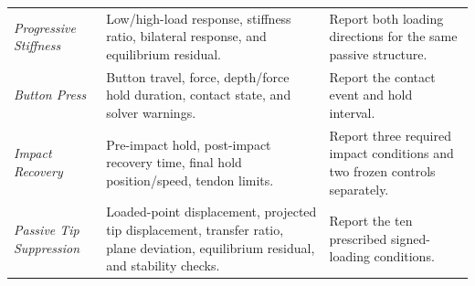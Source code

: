 \begin{table}[!t]
\begin{tabularx}{\textwidth}{@{}>{\itshape}p{}!{\color{TraceGray}\vrule width 0.25pt} >{\raggedright\arraybackslash}p{0.47\textwidth} Y@{}}
Progressive Stiffness & Low/high-load response, stiffness ratio, bilateral response, and equilibrium residual. & Report both loading directions for the same passive structure. \\
Button Press & Button travel, force, depth/force hold duration, contact state, and solver warnings. & Report the contact event and hold interval. \\
Impact Recovery & Pre-impact hold, post-impact recovery time, final hold position/speed, tendon limits. & Report three required impact conditions and two frozen controls separately. \\
Passive Tip Suppression & Loaded-point displacement, projected tip displacement, transfer ratio, plane deviation, equilibrium residual, and stability checks. & Report the ten prescribed signed-loading conditions. \\
\bottomrule
\end{tabularx}
\end{table}

